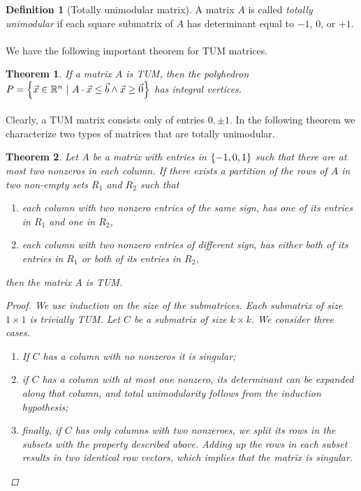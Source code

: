 \documentclass[titlepage]{book}
\theoremstyle{plain}
\newtheorem{theorem}{Theorem}[chapter]
\theoremstyle{definition}
\newtheorem{definition}{Definition}[chapter]
\theoremstyle{remark}
\begin{document}
\begin{definition}[Totally unimodular matrix]
A matrix $A$ is called \emph{totally unimodular} if each square submatrix of $A$ has determinant equal to $-1$, $0$, or $+1$.
\end{definition}

\paragraph{}
We have the following important theorem for TUM matrices.

\begin{theorem}
If a matrix $A$ is TUM, then the polyhedron $P=\left\{ \vec{x}\in\mathbb{R}^n\ |\ A\cdot\vec{x}\leq\vec{b}\wedge\vec{x}\geq\vec{0} \right\}$ has integral vertices.
\end{theorem}

\paragraph{}
Clearly, a TUM matrix consists only of entries $0,\pm 1$. In the following theorem we characterize two types of matrices that are totally unimodular.
\begin{theorem}
Let $A$ be a matrix with entries in $\left\{ -1, 0, 1 \right\}$ such that there are at most two nonzeros in each column. If there exists a partition of the rows of $A$ in two non-empty sets $R_1$ and $R_2$ such that
\begin{enumerate}
 \item each column with two nonzero entries of the same sign, has one of its entries in $R_1$ and one in $R_2$,
 \item each column with two nonzero entries of different sign, has either both of its entries in $R_1$ or both of its entries in $R_2$,
\end{enumerate}
then the matrix $A$ is TUM.
\begin{proof}
We use induction on the size of the submatrices. Each submatrix of size $1\times 1$ is trivially TUM. Let $C$ be a submatrix of size $k\times k$. We consider three cases.
\begin{enumerate}
 \item If $C$ has a column with no nonzeros it is singular;
 \item if $C$ has a column with at most one nonzero, its determinant can be expanded along that column, and total unimodularity follows from the induction hypothesis;
 \item finally, if $C$ has only columns with two nonzeroes, we split its rows in the subsets with the property described above. Adding up the rows in each subset results in two identical row vectors, which implies that the matrix is singular.
\end{enumerate}
\end{proof}
\end{theorem}
\end{document}
